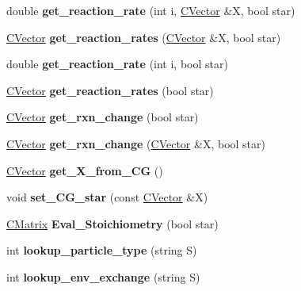 \begin{DoxyCompactItemize}
\item 
\mbox{\label{class_c_m_b_block_a8ba0231c40b029dfff9d7221af2f51bc}} 
double {\bfseries get\+\_\+reaction\+\_\+rate} (int i, \hyperlink{class_c_vector}{C\+Vector} \&X, bool star)
\item 
\mbox{\label{class_c_m_b_block_a809407c7d21ba254564377352c4e645d}} 
\hyperlink{class_c_vector}{C\+Vector} {\bfseries get\+\_\+reaction\+\_\+rates} (\hyperlink{class_c_vector}{C\+Vector} \&X, bool star)
\item 
\mbox{\label{class_c_m_b_block_a8c39b7b900c1b9bee29b8caf32dbb6a2}} 
double {\bfseries get\+\_\+reaction\+\_\+rate} (int i, bool star)
\item 
\mbox{\label{class_c_m_b_block_a488cec7cab5d9db828b450cdc404cbf1}} 
\hyperlink{class_c_vector}{C\+Vector} {\bfseries get\+\_\+reaction\+\_\+rates} (bool star)
\item 
\mbox{\label{class_c_m_b_block_a0123b2da503c56d28d82be276bc0a740}} 
\hyperlink{class_c_vector}{C\+Vector} {\bfseries get\+\_\+rxn\+\_\+change} (bool star)
\item 
\mbox{\label{class_c_m_b_block_a812cccf0d19490e80f35b5d252b3150e}} 
\hyperlink{class_c_vector}{C\+Vector} {\bfseries get\+\_\+rxn\+\_\+change} (\hyperlink{class_c_vector}{C\+Vector} \&X, bool star)
\item 
\mbox{\label{class_c_m_b_block_aaab3f98877269f1ce39ee86ad73f84b4}} 
\hyperlink{class_c_vector}{C\+Vector} {\bfseries get\+\_\+\+X\+\_\+from\+\_\+\+CG} ()
\item 
\mbox{\label{class_c_m_b_block_a84b9d97b03a267cb2cd0c8aad9f802c3}} 
void {\bfseries set\+\_\+\+C\+G\+\_\+star} (const \hyperlink{class_c_vector}{C\+Vector} \&X)
\item 
\mbox{\label{class_c_m_b_block_a4e75a35d3d713ec5591a04b0c09136e2}} 
\hyperlink{class_c_matrix}{C\+Matrix} {\bfseries Eval\+\_\+\+Stoichiometry} (bool star)
\item 
\mbox{\label{class_c_m_b_block_ac921c747c9eb7346db5faf08d54f9d6d}} 
int {\bfseries lookup\+\_\+particle\+\_\+type} (string S)
\item 
\mbox{\label{class_c_m_b_block_af37209376dd8d493b36a2c700723626b}} 
int {\bfseries lookup\+\_\+env\+\_\+exchange} (string S)
\end{DoxyCompactItemize}
